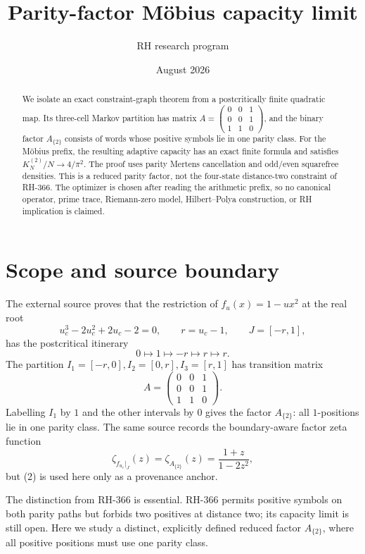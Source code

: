 \documentclass[11pt]{article}
\title{Parity-factor M\"obius capacity limit}
\author{RH research program}
\date{August 2026}
\newcommand{\ParityFactor}{A_{\{2\}}}
\begin{document}
\maketitle

\begin{abstract}
We isolate an exact constraint-graph theorem from a postcritically finite
quadratic map.  Its three-cell Markov partition has matrix
\(A=\left(\begin{smallmatrix}0&0&1\\0&0&1\\1&1&0\end{smallmatrix}\right)\),
and the binary factor \(\ParityFactor\) consists of words whose positive symbols
lie in one parity class.  For the M\"obius prefix, the resulting adaptive
capacity has an exact finite formula and satisfies
\(K_N^{(2)}/N\to4/\pi^2\).  The proof uses parity Mertens cancellation and
odd/even squarefree densities.  This is a reduced parity factor, not the
four-state distance-two constraint of RH-366.  The optimizer is chosen after
reading the arithmetic prefix, so no canonical operator, prime trace,
Riemann-zero model, Hilbert--Polya construction, or RH implication is claimed.
\end{abstract}

\section{Scope and source boundary}

The external source \cite{DynaZeta2026} proves that the restriction of
\(f_u(x)=1-ux^2\) at the real root
\[
 u_c^3-2u_c^2+2u_c-2=0,
 \qquad r=u_c-1,\qquad J=[-r,1],
\]
has the postcritical itinerary
\[
0\longmapsto1\longmapsto-r\longmapsto r\longmapsto r.
\]
The partition \(I_1=[-r,0], I_2=[0,r], I_3=[r,1]\) has transition matrix
\[
 A=\begin{pmatrix}0&0&1\\0&0&1\\1&1&0\end{pmatrix}.
 \tag{1}
\]
Labelling \(I_1\) by $1$ and the other intervals by $0$ gives the factor
\(\ParityFactor\): all $1$-positions lie in one parity class.  The same source
records the boundary-aware factor zeta function
\[
 \zeta_{f_{u_c}|_J}(z)=\zeta_{\ParityFactor}(z)=\frac{1+z}{1-2z^2},
 \tag{2}
\]
but (2) is used here only as a provenance anchor.

The distinction from RH-366 is essential.  RH-366 permits positive symbols
on both parity paths but forbids two positives at distance two; its capacity
limit is still open.  Here we study a distinct, explicitly defined reduced
factor
\(\ParityFactor\), where all positive positions must use one parity class.
\end{document}

